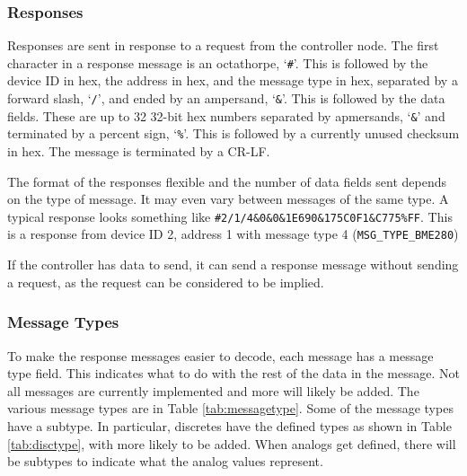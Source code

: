 \documentclass[10pt, openany, draft]{article}
\begin{document}
\subsubsection{Responses}
Responses are sent in response to a request from the controller node.  The first character in a response message is an octathorpe, `\texttt{\#}'.  This is followed by the device ID in hex, the address in hex, and the message type in hex, separated by a forward slash, `\texttt{/}', and ended by an ampersand, `\texttt{\&}'.  This is followed by the data fields.  These are up to 32 32-bit hex numbers separated by apmersands, `\texttt{\&}' and terminated by a percent sign, `\texttt{\%}'.  This is followed by a currently unused checksum in hex.  The message is terminated by a CR-LF.

The format of the responses flexible and the number of data fields sent depends on the type of message.  It may even vary between messages of the same type.  A typical response looks something like \texttt{\#2/1/4\&0\&0\&1E690\&175C0F1\&C775\%FF}.  This is a response from device ID 2, address 1 with message type 4 (\texttt{MSG\_TYPE\_BME280})

If the controller has data to send, it can send a response message without sending a request, as the request can be considered to be implied.

\subsubsection{Message Types}
To make the response messages easier to decode, each message has a message type field.  This indicates what to do with the rest of the data in the message.  Not all messages are currently implemented and more will likely be added.  The various message types are in Table \ref{tab:messagetype}.  Some of the message types have a subtype.  In particular, discretes have the defined types as shown in Table \ref{tab:disctype}, with more likely to be added.  When analogs get defined, there will be subtypes to indicate what the analog values represent.
\end{document}
